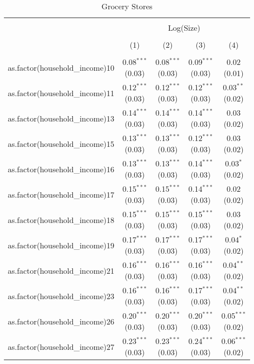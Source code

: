 
\begin{table}[!htbp] \centering 
  \caption{Grocery Stores} 
  \label{tab:packageSizeGroceryappendix} 
\begin{tabular}{@{\extracolsep{5pt}}lcccc} 
\\[-1.8ex]\hline 
\hline \\[-1.8ex] 
 & \multicolumn{4}{c}{Log(Size)} \\ 
\\[-1.8ex] & (1) & (2) & (3) & (4)\\ 
\hline \\[-1.8ex] 
 as.factor(household\_income)10 & 0.08$^{***}$ (0.03) & 0.08$^{***}$ (0.03) & 0.09$^{***}$ (0.03) & 0.02 (0.01) \\ 
  as.factor(household\_income)11 & 0.12$^{***}$ (0.03) & 0.12$^{***}$ (0.03) & 0.12$^{***}$ (0.03) & 0.03$^{**}$ (0.02) \\ 
  as.factor(household\_income)13 & 0.14$^{***}$ (0.03) & 0.14$^{***}$ (0.03) & 0.14$^{***}$ (0.03) & 0.03 (0.02) \\ 
  as.factor(household\_income)15 & 0.13$^{***}$ (0.03) & 0.13$^{***}$ (0.03) & 0.12$^{***}$ (0.03) & 0.03 (0.02) \\ 
  as.factor(household\_income)16 & 0.13$^{***}$ (0.03) & 0.13$^{***}$ (0.03) & 0.14$^{***}$ (0.03) & 0.03$^{*}$ (0.02) \\ 
  as.factor(household\_income)17 & 0.15$^{***}$ (0.03) & 0.15$^{***}$ (0.03) & 0.14$^{***}$ (0.03) & 0.02 (0.02) \\ 
  as.factor(household\_income)18 & 0.15$^{***}$ (0.03) & 0.15$^{***}$ (0.03) & 0.15$^{***}$ (0.03) & 0.03 (0.02) \\ 
  as.factor(household\_income)19 & 0.17$^{***}$ (0.03) & 0.17$^{***}$ (0.03) & 0.17$^{***}$ (0.03) & 0.04$^{*}$ (0.02) \\ 
  as.factor(household\_income)21 & 0.16$^{***}$ (0.03) & 0.16$^{***}$ (0.03) & 0.16$^{***}$ (0.03) & 0.04$^{**}$ (0.02) \\ 
  as.factor(household\_income)23 & 0.16$^{***}$ (0.03) & 0.16$^{***}$ (0.03) & 0.17$^{***}$ (0.03) & 0.04$^{**}$ (0.02) \\ 
  as.factor(household\_income)26 & 0.20$^{***}$ (0.03) & 0.20$^{***}$ (0.03) & 0.20$^{***}$ (0.03) & 0.05$^{***}$ (0.02) \\ 
  as.factor(household\_income)27 & 0.23$^{***}$ (0.03) & 0.23$^{***}$ (0.03) & 0.24$^{***}$ (0.03) & 0.06$^{***}$ (0.02) \\ 

\end{tabular}
\end{table}
